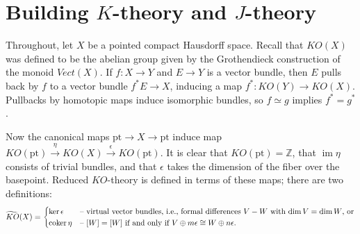 \documentclass{article}
\newcommand{\Z}{\mathbb{Z}}
\newcommand{\ptspace}{\mathrm{pt}}
\DeclareMathOperator{\im}{im}
\DeclareMathOperator{\coker}{coker}
\begin{document}

\section{Building $K$-theory and $J$-theory} %

Throughout, let $X$ be a pointed compact Hausdorff space.  Recall that $KO(X)$ was defined to be the abelian group given by the Grothendieck construction of the monoid $Vect(X)$.  If $f: X \to Y$ and $E \to Y$ is a vector bundle, then $E$ pulls back by $f$ to a vector bundle $f^* E \to X$, inducing a map $f^*: KO(Y) \to KO(X)$.  Pullbacks by homotopic maps induce isomorphic bundles, so $f \simeq g$ implies $f^* = g^*$.

Now the canonical maps $\ptspace \to X \to \ptspace$ induce map $KO(\ptspace) \stackrel{\eta}{\to} KO(X) \stackrel{\epsilon} \to KO(\ptspace)$.  It is clear that $KO(\ptspace) = \Z$, that $\im \eta$ consists of trivial bundles, and that $\epsilon$ takes the dimension of the fiber over the basepoint.  Reduced $KO$-theory is defined in terms of these maps; there are two definitions:
\[
\widetilde{KO}(X) = \begin{cases}
\ker \epsilon & \hbox{-- virtual vector bundles, i.e., formal differences $V - W$ with $\dim V = \dim W$, or} \\
\coker \eta & \hbox{-- $[W] = [W]$ if and only if $V \oplus m \epsilon \cong W \oplus n \epsilon$}.
\end{cases}\]
\end{document}
